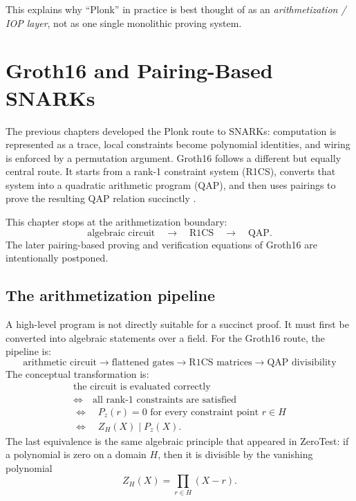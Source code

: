 \documentclass[11pt]{article}
\begin{document}
This explains why ``Plonk'' in practice is best thought of as an \emph{arithmetization / IOP layer}, not as one single monolithic proving system.


\section{Groth16 and Pairing-Based SNARKs}
\label{sec:groth16}

The previous chapters developed the Plonk route to SNARKs: computation is represented as a trace, local constraints become polynomial identities, and wiring is enforced by a permutation argument. Groth16 follows a different but equally central route. It starts from a rank-1 constraint system (R1CS), converts that system into a quadratic arithmetic program (QAP), and then uses pairings to prove the resulting QAP relation succinctly \cite{GennaroGentryParnoRaykova2013,ParnoHowellGentryRaykova2013,Groth2016}.

This chapter stops at the arithmetization boundary:
\[
\text{algebraic circuit}\quad\longrightarrow\quad\text{R1CS}\quad\longrightarrow\quad\text{QAP}.
\]
The later pairing-based proving and verification equations of Groth16 are intentionally postponed.

\subsection{The arithmetization pipeline}

A high-level program is not directly suitable for a succinct proof. It must first be converted into algebraic statements over a field. For the Groth16 route, the pipeline is:
\[
\boxed{
\text{arithmetic circuit}
\longrightarrow
\text{flattened gates}
\longrightarrow
\text{R1CS matrices}
\longrightarrow
\text{QAP divisibility}
}
\]
The conceptual transformation is:
\[
\begin{array}{c}
\text{the circuit is evaluated correctly}\\[0.2em]
\Longleftrightarrow\quad \text{all rank-1 constraints are satisfied}\\[0.2em]
\Longleftrightarrow\quad P_z(r)=0\text{ for every constraint point }r\in H\\[0.2em]
\Longleftrightarrow\quad Z_H(X)\mid P_z(X).
\end{array}
\]
The last equivalence is the same algebraic principle that appeared in ZeroTest: if a polynomial is zero on a domain $H$, then it is divisible by the vanishing polynomial
\[
    Z_H(X)=\prod_{r\in H}(X-r).
\]
\end{document}
